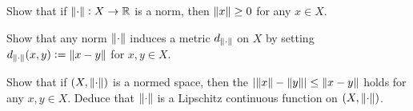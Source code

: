 \begin{exercise}
	Show that if $\norm[0]{\cdot}: X \to \mathbb{R}$ is a norm, then $\norm[0]{x} \geq 0$ for any $x \in X$.
\end{exercise}

\begin{exercise}
	Show that any norm $\norm[0]{\cdot}$ induces a metric $d_{\norm[0]{\cdot}}$ on $X$ by setting $d_{\norm[0]{\cdot}}(x,y) := \norm[0]{x - y}$ for $x,y \in X$.
\end{exercise}

\begin{exercise}
	Show that if $(X,\norm[0]{\cdot})$ is a normed space, then the  $\abs[0]{\norm[0]{x} - \norm[0]{y}} \leq \norm[0]{x - y}$ holds for any $x,y \in X$. Deduce that $\norm[0]{\cdot}$ is a Lipschitz continuous function on $(X,\norm[0]{\cdot})$.
\end{exercise}

